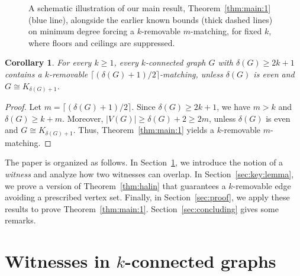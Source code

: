 \documentclass[11pt]{article}
\numberwithin{equation}{section}
\newtheorem{corollary}[theorem]{Corollary}
\begin{document}
\begin{figure}[h!]
\caption{A schematic illustration of our main result, Theorem~\ref{thm:main:1} (blue line), alongside the earlier known bounds (thick dashed lines) on minimum degree forcing a $k$-removable $m$-matching, for fixed $k$, where floors and ceilings are suppressed.}
\label{fig:comparison}
\end{figure}



\begin{corollary}\label{cor1}
For every $k\ge1$, every $k$-connected graph $G$ with $\delta(G)\ge 2k+1$ contains a
$k$-removable $\bigl\lceil(\delta(G)+1)/2\bigr\rceil$-matching, unless $\delta(G)$ is even and $G\cong K_{\delta(G)+1}$.
\end{corollary}
\begin{proof}
Let $m=\bigl\lceil(\delta(G)+1)/2\bigr\rceil$. Since $\delta(G)\ge 2k+1$, we have $m>k$ and $\delta(G)\ge k+m$. Moreover, $|V(G)|\ge \delta(G)+2\ge 2m$, unless $\delta(G)$ is even and $G\cong K_{\delta(G)+1}$. Thus, Theorem~\ref{thm:main:1} yields a $k$-removable $m$-matching.
\end{proof}


The paper is organized as follows. In Section~\ref{sec:witness}, we introduce the notion of a \emph{witness} and analyze how two witnesses can overlap.
In Section~\ref{sec:key:lemma}, we prove a version of Theorem~\ref{thm:halin}  that guarantees a $k$-removable edge avoiding a prescribed vertex set. Finally, in Section~\ref{sec:proof}, we apply these results to prove Theorem~\ref{thm:main:1}. Section~\ref{sec:concluding} gives some remarks.


 

\section{Witnesses in $k$-connected graphs}\label{sec:witness}
\end{document}
